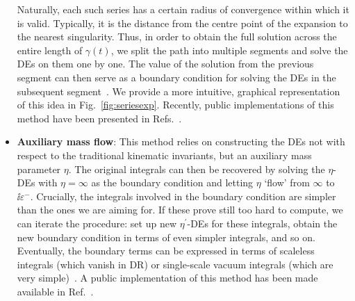 \documentclass[main.tex]{subfiles}
\begin{document}
\begin{itemize}
    Naturally, each such series has a certain radius of convergence within which it is valid. Typically, it is the distance from the centre point of the expansion to the nearest singularity. Thus, in order to obtain the full solution across the entire length of $\gamma(t)$, we split the path into multiple segments and solve the DEs on them one by one. The value of the solution from the previous segment can then serve as a boundary condition for solving the DEs in the subsequent segment~\cite{Moriello:2019yhu, Bonciani:2019jyb, Frellesvig:2019byn}. We provide a more intuitive, graphical representation of this idea in Fig.~\ref{fig:seriesexp}. Recently, public implementations of this method have been presented in Refs.~\cite{Hidding:2020ytt, Armadillo:2022ugh}.
    \item \textbf{Auxiliary mass flow}: This method relies on constructing the DEs not with respect to the traditional kinematic invariants, but an auxiliary mass parameter $\eta$. The original integrals can then be recovered by solving the $\eta$-DEs with $\eta = \infty$ as the boundary condition and letting $\eta$ `flow' from $\infty$ to $\ii \varepsilon^-$. Crucially, the integrals involved in the boundary condition are simpler than the ones we are aiming for. If these prove still too hard to compute, we can iterate the procedure: set up new $\eta^\prime$-DEs for these integrals, obtain the new boundary condition in terms of even simpler integrals, and so on. Eventually, the boundary terms can be expressed in terms of scaleless integrals (which vanish in DR) or single-scale vacuum integrals (which are very simple)~\cite{Liu:2017jxz, Liu:2021wks}. A public implementation of this method has been made available in Ref.~\cite{Liu:2022chg}.
\end{itemize}
\end{document}

